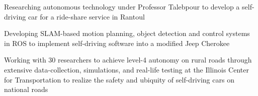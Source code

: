 \begin{cvitemize}
\item Researching autonomous technology under Professor Talebpour to develop a self-driving car for a ride-share service in Rantoul
\item Developing SLAM-based motion planning, object detection and control systems in ROS to implement self-driving software into a modified Jeep Cherokee
\item Working with 30 researchers to achieve level-4 autonomy on rural roads through extensive data-collection, simulations, and real-life testing at the Illinois Center for Transportation to realize the safety and ubiquity of self-driving cars on national roads
\end{cvitemize}